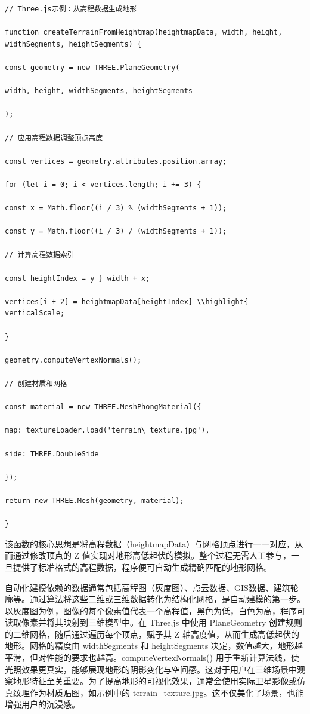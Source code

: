 \begin{lstlisting}[style=javascript]
// Three.js示例：从高程数据生成地形

function createTerrainFromHeightmap(heightmapData, width, height, widthSegments, heightSegments) {

const geometry = new THREE.PlaneGeometry(

width, height, widthSegments, heightSegments

);

// 应用高程数据调整顶点高度

const vertices = geometry.attributes.position.array;

for (let i = 0; i < vertices.length; i += 3) {

const x = Math.floor((i / 3) % (widthSegments + 1));

const y = Math.floor((i / 3) / (widthSegments + 1));

// 计算高程数据索引

const heightIndex = y } width + x;

vertices[i + 2] = heightmapData[heightIndex] \\highlight{ verticalScale;

}

geometry.computeVertexNormals();

// 创建材质和网格

const material = new THREE.MeshPhongMaterial({

map: textureLoader.load('terrain\_texture.jpg'),

side: THREE.DoubleSide

});

return new THREE.Mesh(geometry, material);

}
\end{lstlisting}

该函数的核心思想是将高程数据（heightmapData）与网格顶点进行一一对应，从而通过修改顶点的 Z 值实现对地形高低起伏的模拟。整个过程无需人工参与，一旦提供了标准格式的高程数据，程序便可自动生成精确匹配的地形网格。

自动化建模依赖的数据通常包括高程图（灰度图）、点云数据、GIS数据、建筑轮廓等。通过算法将这些二维或三维数据转化为结构化网格，是自动建模的第一步。以灰度图为例，图像的每个像素值代表一个高程值，黑色为低，白色为高，程序可读取像素并将其映射到三维模型中。在 Three.js 中使用 PlaneGeometry 创建规则的二维网格，随后通过遍历每个顶点，赋予其 Z 轴高度值，从而生成高低起伏的地形。网格的精度由 widthSegments 和 heightSegments 决定，数值越大，地形越平滑，但对性能的要求也越高。computeVertexNormals() 用于重新计算法线，使光照效果更真实，能够展现地形的阴影变化与空间感。这对于用户在三维场景中观察地形特征至关重要。为了提高地形的可视化效果，通常会使用实际卫星影像或仿真纹理作为材质贴图，如示例中的 terrain\_texture.jpg。这不仅美化了场景，也能增强用户的沉浸感。

